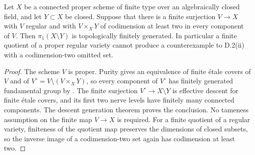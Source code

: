 \begin{proposition}
\label{D:finite-regular-cover}
Let $X$ be a connected proper scheme of finite type over an
algebraically closed field, and let $Y\subset X$ be closed.
Suppose that there is a finite surjection $V\to X$ with $V$ regular
and with $V\times_XY$ of codimension at least two in every component
of $V$. Then $\pi_1(X\setminus Y)$ is topologically finitely generated.
In particular a finite quotient of a proper regular variety cannot
produce a counterexample to D.2(ii) with a codimension-two omitted set.
\end{proposition}
\begin{proof}
The scheme $V$ is proper. Purity gives an equivalence of finite
\'etale covers of $V$ and of $V^\circ=V\setminus(V\times_XY)$,
so every component of $V^\circ$ has finitely generated fundamental
group by \cite[X, Theorem 2.9]{SGA1}. The finite surjection
$V^\circ\to X\setminus Y$ is effective descent for finite \'etale
covers, and its first two nerve levels have finitely many connected
components. The descent generation theorem
\cite[IX, Corollary 5.2, pp. 247--248]{SGA1} proves the conclusion.
No tameness assumption on the finite map $V\to X$ is required.
For a finite quotient of a regular variety, finiteness of the quotient
map preserves the dimensions of closed subsets, so the inverse image
of a codimension-two set again has codimension at least two.
\end{proof}

